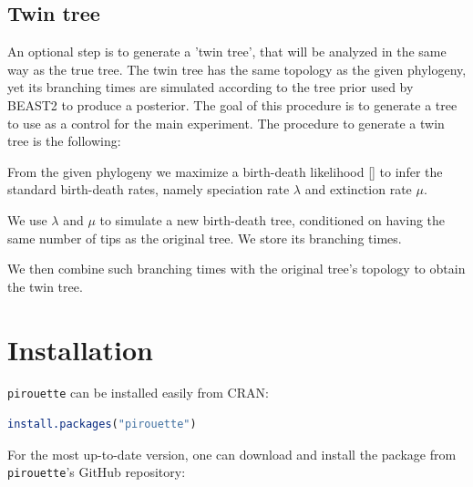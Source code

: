 \documentclass{article}
\newcommand{\giovanni}[1]{\textcolor{blue}{\textbf{[GL: #1]}}}
\begin{document}
\subsection{Twin tree}

An optional step is to generate a 'twin tree', that will be
analyzed in the same way as the true tree.
The twin tree has the same topology as the given phylogeny, yet its branching times are simulated according to the tree prior used by BEAST2 to produce a posterior.
The goal of this procedure is to generate a tree to use as a control for the main experiment.
The procedure to generate a twin tree is the following:

From the given phylogeny we maximize a birth-death likelihood [\cite{nee1994reconstructed}] to infer the standard birth-death rates, namely speciation rate $\lambda$ and extinction rate $\mu$.

We use $\lambda$ and $\mu$ to simulate a new birth-death tree, conditioned on having the same number of tips as the original tree. We store its branching times.

We then combine such branching times with the original tree's topology to obtain the twin tree.

\section{Installation}

\verb;pirouette; can be installed easily from CRAN:

\begin{lstlisting}[language=R, floatplacement=H, frame=single]
install.packages("pirouette")
\end{lstlisting}

For the most up-to-date version, 
one can download and install the package from \verb;pirouette;'s GitHub repository:
\end{document}
